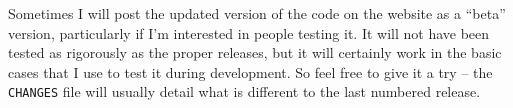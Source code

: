 Sometimes I will post the updated version of the code on the website
as a ``beta'' version, particularly if I'm interested in people
testing it. It will not have been tested as rigorously as the proper
releases, but it will certainly work in the basic cases that I use to
test it during development. So feel free to give it a try -- the
\texttt{CHANGES} file will usually detail what is different to the last
numbered release.

